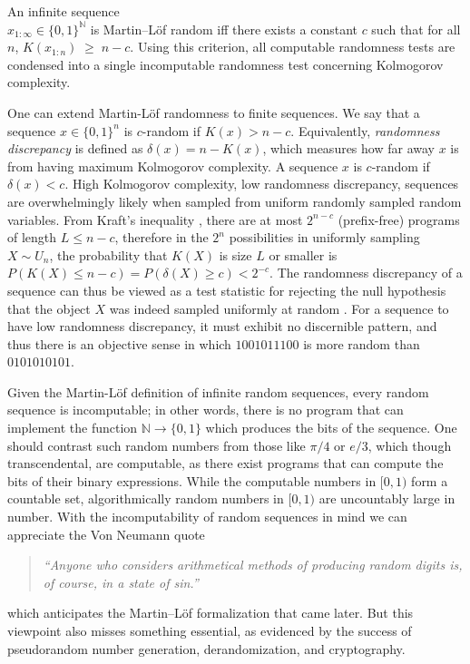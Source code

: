 \documentclass[twoside]{article}
\begin{document}
\begin{definition} An infinite sequence \\
$x_{1:\infty} \in \{0,1\}^{\mathbb{N}}$ is Martin--L\"of random iff there exists a constant $c$ such that for all $n$, $K(x_{1:n}) \;\ge\; n - c$. Using this criterion, all computable randomness tests are condensed into a single incomputable randomness test concerning Kolmogorov complexity. 
\end{definition}

One can extend Martin-L\"of randomness to finite sequences. We say that a sequence $x \in \{0,1\}^n$ is $c$-random if $K(x)>n-c$. Equivalently, \emph{randomness discrepancy} is defined as $\delta(x) = n-K(x)$, which measures how far away $x$ is from having maximum Kolmogorov complexity. A sequence $x$ is $c$-random if $\delta(x)<c$. High Kolmogorov complexity, low randomness discrepancy, sequences are overwhelmingly likely when sampled from uniform randomly sampled random variables. From Kraft's inequality \citep{Kraft1949Device,McMillan1956TwoInequalities}, there are at most $2^{n-c}$ (prefix-free) programs of length $L\le n-c$, therefore in the $2^n$ possibilities in uniformly sampling $X\sim U_n$, the probability that $K(X)$ is size $L$ or smaller is $P(K(X)\le n-c) = P(\delta(X) \ge c) < 2^{-c}$. The randomness discrepancy of a sequence can thus be viewed as a test statistic for rejecting the null hypothesis that the object $X$ was indeed sampled uniformly at random \citep{grunwald2008algorithmic}. For a sequence to have low randomness discrepancy, it must exhibit no discernible pattern, and thus there is an objective sense in which $1001011100$ is more random than $0101010101$.

Given the Martin-L\"of definition of infinite random sequences, every random sequence is incomputable; in other words, there is no program that can implement the function $\mathbb{N}\to \{0,1\}$ which produces the bits of the sequence. One should contrast such random numbers from those like $\pi/4$ or $e/3$, which though transcendental, are computable, as there exist programs that can compute the bits of their binary expressions. While the computable numbers in $[0,1)$ form a countable set, algorithmically random numbers in $[0,1)$ are uncountably large in number. With the incomputability of random sequences in mind we can appreciate the Von Neumann quote
\begin{quote}
\emph{“Anyone who considers arithmetical methods of producing random digits is, of course, in a state of sin.”} \citep{vonNeumann1951RandomDigits}
\end{quote}
which anticipates the Martin--L\"of formalization that came later. But this viewpoint also misses something essential, as evidenced by the success of pseudorandom number generation, derandomization, and cryptography.
%
\end{document}
